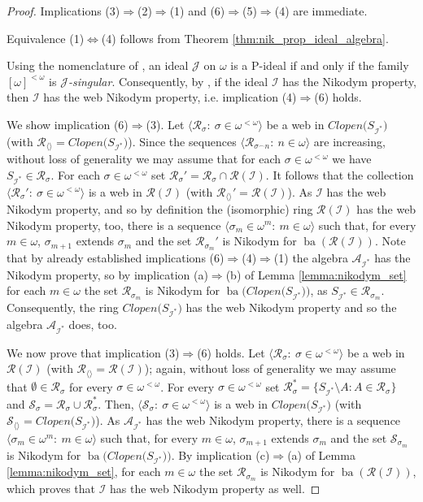 \documentclass[a4paper,11pt,fleqn]{amsart}
\theoremstyle{definition}
\theoremstyle{remark}
\numberwithin{equation}{section}
\newcommand{\N}{\mathbb{N}}
\newcommand{\aA}{\mathcal{A}}
\newcommand{\iI}{\mathcal{I}}
\newcommand{\jJ}{\mathcal{J}}
\newcommand{\rR}{\mathcal{R}}
\newcommand{\sS}{\mathcal{S}}
\DeclareMathOperator{\ba}{ba}
\newcommand{\concat}{{^\smallfrown}}
\newcommand{\sm}{\setminus}
\newcommand{\seq}[2]{\big\langle#1\colon\ #2\big\rangle}
\newcommand{\seqn}[1]{\big\langle#1\colon\ n\io\big\rangle}
\newcommand{\seqm}[1]{\big\langle#1\colon\ m\io\big\rangle}
\newcommand{\finsub}[1]{\left[#1\right]^{<\omega}}
\newcommand{\io}{\in\omega}%
\newcommand{\fso}{\finsub{\omega}}%
\begin{document}
\begin{proof}
Implications (3)$\Rightarrow$(2)$\Rightarrow$(1) and (6)$\Rightarrow$(5)$\Rightarrow$(4) are immediate.

Equivalence (1)$\Leftrightarrow$(4) follows from Theorem \ref{thm:nik_prop_ideal_algebra}.

Using the nomenclature of \cite{FLALP}, an ideal $\jJ$ on $\omega$ is a P-ideal if and only if the family $\fso$ is \textit{$\jJ$-singular}. Consequently, by \cite[Theorem 3.3]{FLALP}, if the ideal $\iI$ has the Nikodym property, then $\iI$ has the web Nikodym property, i.e. implication (4)$\Rightarrow$(6) holds.

We show implication (6)$\Rightarrow$(3). Let $\seq{\rR_\sigma}{\sigma\in\omega^{<\omega}}$ be a web in $Clopen\big(S_{\iI^*}\big)$ (with $\rR_{\langle\rangle}=Clopen\big(S_{\iI^*}\big)$). Since the sequences $\seqn{\rR_{\sigma\concat n}}$ are increasing, without loss of generality we may assume that for each $\sigma\in\omega^{<\omega}$ we have $S_{\iI^*}\in\rR_\sigma$. For each $\sigma\in\omega^{<\omega}$ set $\rR_\sigma'=\rR_\sigma\cap\rR(\iI)$. It follows that the collection $\seq{\rR_\sigma'}{\sigma\in\omega^{<\omega}}$ is a web in $\rR(\iI)$ (with $\rR_{\langle\rangle}'=\rR(\iI)$). As $\iI$ has the web Nikodym property, and so by definition the (isomorphic) ring $\rR(\iI)$ has the web Nikodym property, too, there is a sequence $\seqm{\sigma_m\in\omega^m}$ such that, for every $m\io$, $\sigma_{m+1}$ extends $\sigma_m$ and the set $\rR_{\sigma_m}'$ is Nikodym for $\ba(\rR(\iI))$. Note that by already established implications (6)$\Rightarrow$(4)$\Rightarrow$(1) the algebra $\aA_{\iI^*}$ has the Nikodym property, so by implication (a)$\Rightarrow$(b) of Lemma \ref{lemma:nikodym_set} for each $m\io$ the set $\rR_{\sigma_m}$ is Nikodym for $\ba\!\big(Clopen\big(S_{\iI^*}\big)\big)$, as $S_{\iI^*}\in\rR_{\sigma_m}$. Consequently, the ring $Clopen\big(S_{\iI^*}\big)$ has the web Nikodym property and so the algebra $\aA_{\iI^*}$ does, too.

We now prove that implication (3)$\Rightarrow$(6) holds. Let $\seq{\rR_\sigma}{\sigma\in\omega^{<\omega}}$ be a web in $\rR(\iI)$ (with $\rR_{\langle\rangle}=\rR(\iI)$); again, without loss of generality we may assume that $\emptyset\in\rR_\sigma$ for every $\sigma\in\omega^{<\omega}$. For every $\sigma\in\omega^{<\omega}$ set $\rR_\sigma^*=\big\{S_{\iI^*}\sm A\colon A\in\rR_\sigma\big\}$ and $\sS_\sigma=\rR_\sigma\cup\rR_\sigma^*$. Then, $\seq{\sS_\sigma}{\sigma\in\omega^{<\omega}}$ is a web in $Clopen\big(S_{\iI^*}\big)$ (with $\sS_{\langle\rangle}=Clopen\big(S_{\iI^*}\big)$). As $\aA_{\iI^*}$ has the web Nikodym property, there is a sequence $\seqm{\sigma_m\in\omega^m}$ such that, for every $m\io$, $\sigma_{m+1}$ extends $\sigma_m$ and the set $\sS_{\sigma_m}$ is Nikodym for $\ba\big(Clopen\big(S_{\iI^*}\big)\big)$. By implication (c)$\Rightarrow$(a) of Lemma \ref{lemma:nikodym_set}, for each $m\io$ the set $\rR_{\sigma_m}$ is Nikodym for $\ba(\rR(\iI))$, which proves that $\iI$ has the web Nikodym property as well.


\end{proof}
\end{document}
